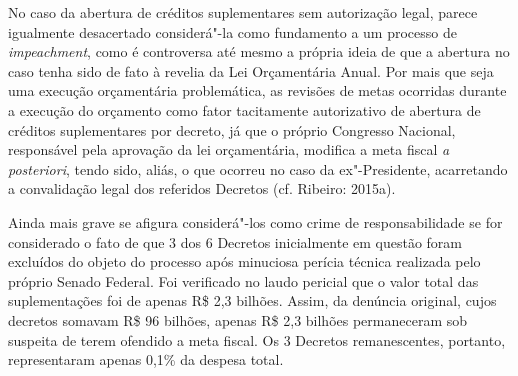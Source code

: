 No caso da abertura de créditos suplementares sem autorização legal,
parece igualmente desacertado considerá"-la como fundamento a um processo
de \emph{impeachment}, como é controversa até mesmo a própria ideia de
que a abertura no caso tenha sido de fato à revelia da Lei Orçamentária
Anual. Por mais que seja uma execução orçamentária problemática, as
revisões de metas ocorridas durante a execução do orçamento como fator
tacitamente autorizativo de abertura de créditos suplementares por
decreto, já que o próprio Congresso Nacional, responsável pela aprovação
da lei orçamentária, modifica a meta fiscal \emph{a posteriori}, tendo
sido, aliás, o que ocorreu no caso da ex"-Presidente, acarretando a
convalidação legal dos referidos Decretos (cf. Ribeiro: 2015a).

Ainda mais grave se afigura considerá"-los como crime de responsabilidade
se for considerado o fato de que 3 dos 6 Decretos inicialmente em
questão foram excluídos do objeto do processo após minuciosa perícia
técnica realizada pelo próprio Senado Federal. Foi verificado no laudo
pericial que o valor total das suplementações foi de apenas R\$ 2,3
bilhões. Assim, da denúncia original, cujos decretos somavam R\$ 96
bilhões, apenas R\$ 2,3 bilhões permaneceram sob suspeita de terem
ofendido a meta fiscal. Os 3 Decretos remanescentes, portanto,
representaram apenas 0,1\% da despesa total.

